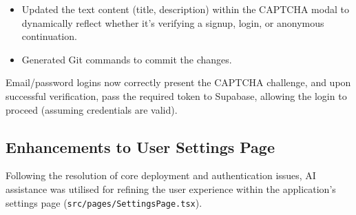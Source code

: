 \documentclass[11pt]{article} %
\begin{document}
\begin{description}[style=unboxed,leftmargin=0pt]
\begin{itemize}
             \item Updated the text content (title, description) within the CAPTCHA modal to dynamically reflect whether it's verifying a signup, login, or anonymous continuation.
            \item Generated Git commands to commit the changes.
         \end{itemize}
    \item[Outcome:] Email/password logins now correctly present the CAPTCHA challenge, and upon successful verification, pass the required token to Supabase, allowing the login to proceed (assuming credentials are valid).
\end{description}

\subsection{Enhancements to User Settings Page}
Following the resolution of core deployment and authentication issues, AI assistance was utilised for refining the user experience within the application's settings page (\texttt{src/pages/SettingsPage.tsx}).
\end{document}
